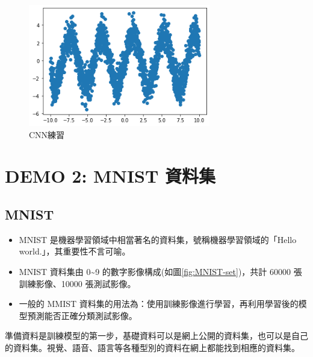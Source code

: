 \documentclass[a4paper,12pt]{article}
\begin{document}
\begin{figure}[htbp]
\centering
\includegraphics[width=300]{images/random_curve.png}
\caption{\label{fig:CNN_practice}CNN練習}
\end{figure}
\newpage

\section{DEMO 2: MNIST 資料集}
\label{sec:org9e0f173}
\subsection{MNIST}
\label{sec:orgc481e60}
\begin{itemize}
\item MNIST 是機器學習領域中相當著名的資料集，號稱機器學習領域的「Hello world.」，其重要性不言可喻。\\
\item MNIST 資料集由 0\textasciitilde{}9 的數字影像構成(如圖\ref{fig:MNIST-set})，共計 60000 張訓練影像、10000 張測試影像。\\
\item 一般的 MMIST 資料集的用法為：使用訓練影像進行學習，再利用學習後的模型預測能否正確分類測試影像。\\
\end{itemize}

準備資料是訓練模型的第一步，基礎資料可以是網上公開的資料集，也可以是自己的資料集。視覺、語音、語言等各種型別的資料在網上都能找到相應的資料集。\\
\end{document}
